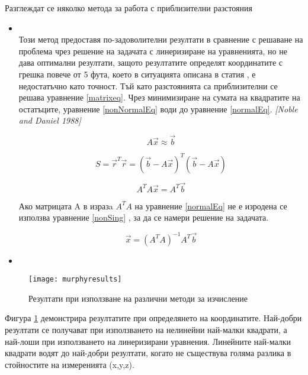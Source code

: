Разглеждат се няколко метода за работа с приблизителни разстояния

\begin{itemize}
    \item {} \\ Този метод предоставя по-задоволителни резултати в сравнение с решаване на проблема чрез решение на задачата с линеризиране на уравненията, но не дава оптимални резултати, защото резултатите определят координатите с  грешка повече от 5 фута, което в ситуацията описана в статия \cite{murphy}, е недостатъчно като точност. Тъй като разстоянията са приблизителни се решава уравнение \ref{matrixeq}. Чрез минимизиране на сумата на квадратите на остатъците, уравнение \ref{nonNormalEq} води до уравнение \ref{normalEq}. \textit{[Noble and Daniel 1988]}
    
    \begin{equation} \label{matrixeq}
      A \vec{x} \approx \vec{b} 
    \end{equation}
    
    \begin{equation} \label{nonNormalEq}
        S = \vec{r}^T \vec{r} = (\vec{b} - A \vec{x})^T ( \vec{b} - A \vec{x})
    \end{equation}
    
    \begin{equation} \label{normalEq}
        A^T A \vec{x} = A^T \vec{b}
    \end{equation}
    
        
    Ако матрицата A в изразa $A^T A$ на уравнение \ref{normalEq} не е изродена се използва уравнение \ref{nonSing} , за да се намери решение на задачата.

    \begin{equation} \label{nonSing}
        \vec{x} = (A^T A)^{-1} A^T \vec{b}
    \end{equation}
    
    \item {}
    
\end{itemize}



\begin{figure}
    \centering
    \texttt{[image: murphyresults]}
    \caption{Резултати при използване на различни методи за изчисление}
    \label{fig:murphyResults}
\end{figure}



Фигура \ref{fig:murphyResults} демонстрира резултатите при определянето на координатите. Най-добри резултати се получават при използването на нелинейни най-малки квадрати, а най-лоши при използването на линеризирани уравнения. Линейните най-малки квадрати водят до най-добри резултати, когато не съществува голяма разлика в стойностите на измеренията (x,y,z).